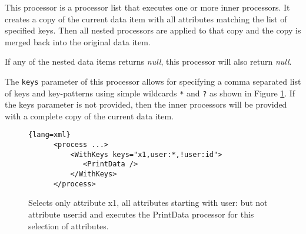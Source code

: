 
This processor is a processor list that executes one or more inner
processors. It creates a copy of the current data item with all
attributes matching the list of specified keys. Then all nested
processors are applied to that copy and the copy is merged back into
the original data item.

If any of the nested data items returns \emph{null}, this processor will
also return \emph{null}.

The \texttt{keys} parameter of this processor allows for specifying a
comma separated list of keys and key-patterns using simple wildcards
\texttt{*} and \texttt{?} as shown in Figure \ref{fig:withKeys}. If
the {\ttfamily keys} parameter is not provided, then the inner
processors will be provided with a complete copy of the current data
item.

\begin{figure}[h!]
\begin{lstlisting}{lang=xml}
      <process ...>
          <WithKeys keys="x1,user:*,!user:id">
             <PrintData />
          </WithKeys>
      </process>
\end{lstlisting}
\caption{\label{fig:withKeys}Selects only attribute {\ttfamily x1},
  all attributes starting with {\ttfamily user:} but not attribute
  {\ttfamily user:id} and executes the {\ttfamily PrintData} processor
  for this selection of attributes.}
\end{figure}


\begin{table}[h]
\end{table}
